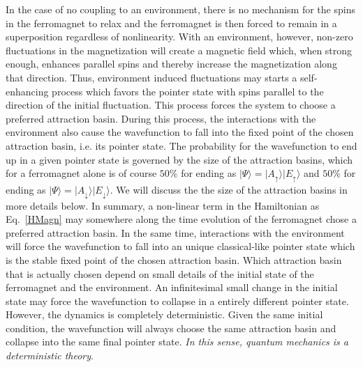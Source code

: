\documentclass[showpacs,preprintnumbers,amsmath,amssymb,12pt]{revtex4-2}
\begin{document}
In the case of no coupling to an environment, there is no mechanism
for the spins in the ferromagnet to relax and the ferromagnet is then
forced to remain in a superposition regardless of nonlinearity. With
an environment, however, non-zero fluctuations in the magnetization
will create a magnetic field which, when strong enough, enhances
parallel spins and thereby increase the magnetization along that
direction. Thus, environment induced fluctuations may starts a
self-enhancing process which favors the pointer state with spins
parallel to the direction of the initial fluctuation. This process
forces the system to choose a preferred attraction basin. During this
process, the interactions with the environment also cause the
wavefunction to fall into the fixed point of the chosen attraction
basin, i.e. its pointer state. The probability for the wavefunction to
end up in a given pointer state is governed by the size of the
attraction basins, which for a ferromagnet alone is of course $50\%$
for ending as $|\Psi \rangle = |A_\uparrow \rangle |E_\uparrow
\rangle$ and $50\%$ for ending as $|\Psi \rangle = |A_\downarrow
\rangle |E_\downarrow \rangle$. We will discuss the the size of the
attraction basins in more details below. In summary, a non-linear term
in the Hamiltonian as Eq.~\eqref{HMagn} may somewhere along the time
evolution of the ferromagnet chose a preferred attraction basin. In
the same time, interactions with the environment will force the
wavefunction to fall into an unique classical-like pointer state which
is the stable fixed point of the chosen attraction basin. Which
attraction basin that is actually chosen depend on small details of
the initial state of the ferromagnet and the environment. An
infinitesimal small change in the initial state may force the
wavefunction to collapse in a entirely different pointer
state. However, the dynamics is completely deterministic.  Given the
same initial condition, the wavefunction will always choose the same
attraction basin and collapse into the same final pointer
state. \emph{In this sense, quantum mechanics is a deterministic
  theory}.
\end{document}
